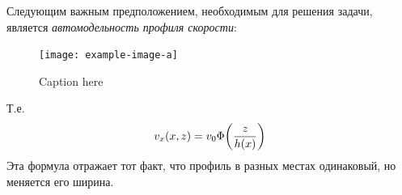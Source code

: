 

Следующим важным предположением, необходимым для решения задачи, является \textit{автомодельность профиля скорости}:
\begin{figure}[H]
    \centering
    \texttt{[image: example-image-a]}
    \caption{Caption here}
    \label{fig:figure1}
\end{figure}
Т.е.
\begin{equation}
    v_x (x,z) = v_0 \Phi\qty(\frac{z}{h(x)})
\end{equation}
Эта формула отражает тот факт, что профиль в разных местах одинаковый, 
но меняется его ширина.

